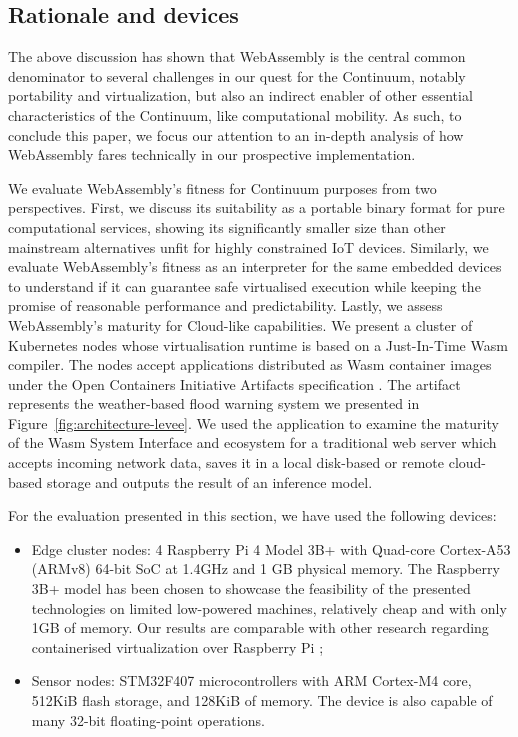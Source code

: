 \subsection{Rationale and devices}

The above discussion has shown that WebAssembly is the central common denominator to several challenges in our quest for the Continuum, notably portability and virtualization, but also an indirect enabler of other essential characteristics of the Continuum, like computational mobility. 
As such, to conclude this paper, we focus our attention to an in-depth analysis of how WebAssembly fares technically in our prospective implementation.

We evaluate WebAssembly's fitness for Continuum purposes from two perspectives. First, we discuss its suitability as a portable binary format for pure computational services, showing its significantly smaller size than other mainstream alternatives unfit for highly constrained IoT devices. Similarly, we evaluate WebAssembly's fitness as an interpreter for the same embedded devices to understand if it can guarantee safe virtualised execution while keeping the promise of reasonable performance and predictability. Lastly, we assess WebAssembly's maturity for Cloud-like capabilities. We present a cluster of Kubernetes nodes whose virtualisation runtime is based on a Just-In-Time Wasm compiler. The nodes accept applications distributed as Wasm container images under the Open Containers Initiative Artifacts specification \cite{oci-artifacts}. The artifact represents the weather-based flood warning system we presented in Figure~\ref{fig:architecture-levee}. We used the application to examine the maturity of the Wasm System Interface and ecosystem for a traditional web server which accepts incoming network data, saves it in a local disk-based or remote cloud-based storage and outputs the result of an inference model.

For the evaluation presented in this section, we have used the following devices:
\begin{itemize}
    \item Edge cluster nodes: 4 Raspberry Pi 4 Model 3B+ with Quad-core Cortex-A53 (ARMv8) 64-bit SoC at 1.4GHz and 1 GB physical memory. The Raspberry 3B+ model has been chosen to showcase the feasibility of the presented technologies on limited low-powered machines, relatively cheap and with only 1GB of memory. Our results are comparable with other research regarding containerised virtualization over Raspberry Pi \cite{bellavista2017feasibility};
    \item Sensor nodes: STM32F407 microcontrollers with ARM Cortex-M4 core, 512KiB flash storage, and 128KiB of memory. The device is also capable of many 32-bit floating-point operations.
\end{itemize}

